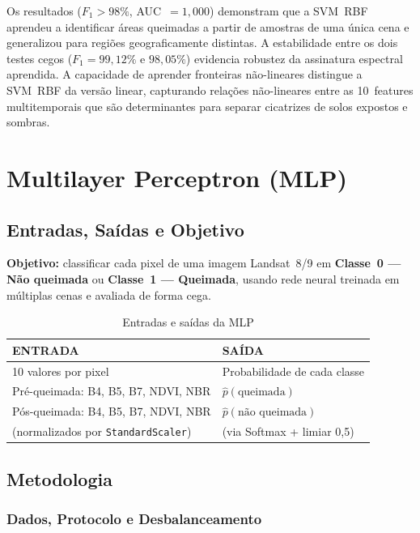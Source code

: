 \documentclass[conference]{IEEEtran}
\begin{document}
Os resultados ($F_1 > 98\%$, AUC~$= 1{,}000$) demonstram que a SVM~RBF
aprendeu a identificar áreas queimadas a partir de amostras de uma única
cena e generalizou para regiões geograficamente distintas. A estabilidade
entre os dois testes cegos ($F_1 = 99{,}12\%$ e $98{,}05\%$) evidencia
robustez da assinatura espectral aprendida. A capacidade de aprender
fronteiras não-lineares distingue a SVM~RBF da versão linear, capturando
relações não-lineares entre as 10~features multitemporais que são
determinantes para separar cicatrizes de solos expostos e sombras.

\section{Multilayer Perceptron (MLP)}

\subsection{Entradas, Saídas e Objetivo}

\textbf{Objetivo:} classificar cada pixel de uma imagem Landsat~8/9 em
\textbf{Classe~0 — Não queimada} ou \textbf{Classe~1 — Queimada}, usando
rede neural treinada em múltiplas cenas e avaliada de forma cega.

\begin{table}[!t]
  \caption{Entradas e saídas da MLP}
  \label{tab:mlp_io}
  \centering
  \begin{tabular}{ll}
    \toprule
    \textbf{ENTRADA} & \textbf{SAÍDA} \\
    \midrule
    10 valores por pixel & Probabilidade de cada classe \\
    Pré-queimada: B4, B5, B7, NDVI, NBR & $\hat{p}(\text{queimada})$ \\
    Pós-queimada: B4, B5, B7, NDVI, NBR & $\hat{p}(\text{não queimada})$ \\
    (normalizados por \texttt{StandardScaler}) & (via Softmax + limiar 0,5) \\
    \bottomrule
  \end{tabular}
\end{table}

\subsection{Metodologia}

\subsubsection{Dados, Protocolo e Desbalanceamento}
\end{document}
